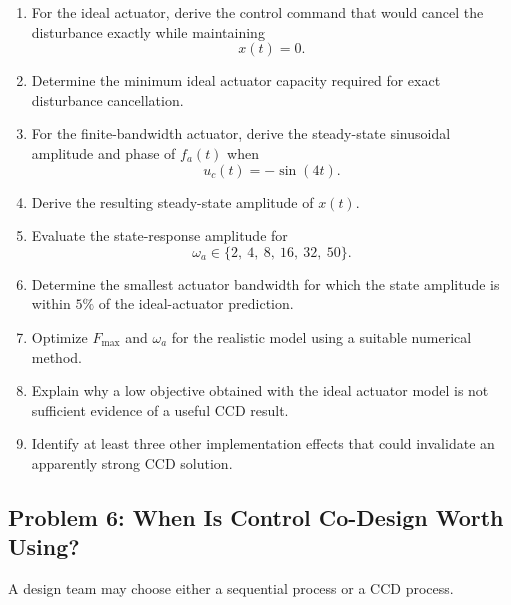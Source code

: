 \begin{enumerate}
    \item For the ideal actuator, derive the control command that would
    cancel the disturbance exactly while maintaining
    \begin{equation}
    x(t)=0.
    \end{equation}

    \item Determine the minimum ideal actuator capacity required for exact
    disturbance cancellation.

    \item For the finite-bandwidth actuator, derive the steady-state
    sinusoidal amplitude and phase of $f_a(t)$ when
    \begin{equation}
    u_c(t)=-\sin(4t).
    \end{equation}

    \item Derive the resulting steady-state amplitude of $x(t)$.

    \item Evaluate the state-response amplitude for
    \begin{equation}
    \omega_a
    \in
    \{2,\ 4,\ 8,\ 16,\ 32,\ 50\}.
    \end{equation}

    \item Determine the smallest actuator bandwidth for which the state
    amplitude is within $5\%$ of the ideal-actuator prediction.

    \item Optimize $F_{\max}$ and $\omega_a$ for the realistic model using a
    suitable numerical method.

    \item Explain why a low objective obtained with the ideal actuator model
    is not sufficient evidence of a useful CCD result.

    \item Identify at least three other implementation effects that could
    invalidate an apparently strong CCD solution.
\end{enumerate}


\subsection*{Problem 6: When Is Control Co-Design Worth Using?}

A design team may choose either a sequential process or a CCD process.

